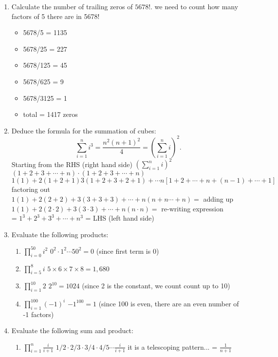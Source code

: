 \documentclass{article}
\begin{document}
\begin{enumerate}
		\item Calculate the number of trailing zeros of $5678!$.
			\subitem we need to count how many factors of 5 there are in 5678!
		\begin{itemize}
		\item 5678/5 = 1135 
		\item 5678/25 = 227  
		\item 5678/125 = 45  
		\item 5678/625 = 9  
		\item 5678/3125 = 1
		\item total = 1417 zeros
		\end{itemize}
		
		
		\item Deduce the formula for the summation of cubes:
		\[ \sum_{i=1}^{n} i^3 = \frac{n^2 (n+1)^2}{4} = \left( \sum_{i=1}^{n} i \right)^2. \]
		\subitem Starting from the RHS (right hand side)
		$(\sum_{i=1}^{n} i)^2$ \\
		$(1+2+3+\cdots + n) \cdot (1+2+3+\cdots + n)$ \\ 
		$1(1)+ 2(1+2+1) 3 (1+2+3+2+1)+ \cdots n[1+2+\cdots + n+(n-1) + \cdots + 1]$ factoring out  \\ 
		$1(1) + 2(2+2) + 3(3+3+3) + \cdots + n(n+n \cdots + n) = $ adding up \\ 
		$1(1) + 2(2\cdot2) + 3(3\cdot3) + \cdots + n(n\cdot n)= $ re-writing expression \\ 
		= $1^3 + 2^3 + 3^3 +\cdots + n^3$ = LHS (left hand side)
		
		
		
		\item Evaluate the following products:
		\begin{enumerate}
			\item $\prod_{i=0}^{50} i^2$
			\subitem $0^2 \cdot 1^2 \cdots 50^2 = 0$ (since first term is 0)
			\item $\prod_{i=5}^{8} i$
			\subitem $5 \times 6 \times 7 \times 8 = 1,680 $
			\item $\prod_{i=1}^{10} 2$
			\subitem $2^10 = 1024$ (since 2 is the constant, we count count up to 10)
			\item $\prod_{i=1}^{100} (-1)^i$
			\subitem $-1^{100} = 1$ (since 100 is even, there are an even number of -1 factors)
		\end{enumerate}
		
		\item Evaluate the following sum and product:
		\begin{enumerate}
			\item $\prod_{i=1}^{n} \frac{i}{i+1}$
			\subitem $1/2 \cdot 2/3 \cdot 3/4 \cdot 4/5 \cdots \frac{i}{i+1} $ it is a telescoping pattern... = $\frac{1}{n+1}$
			

\end{enumerate}
\end{enumerate}
\end{document}
